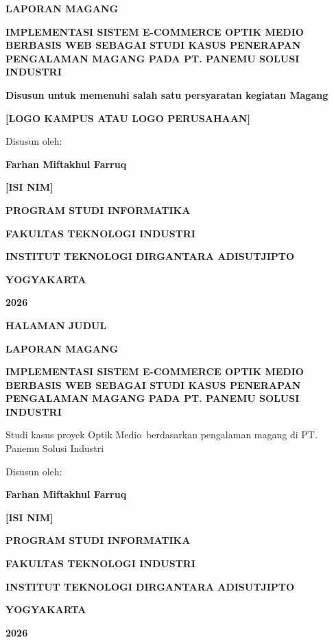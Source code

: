 \documentclass[12pt,a4paper,oneside]{report}
\newcommand{\placeholder}[1]{\textbf{[#1]}}
\newcommand{\namamahasiswa}{Farhan Miftakhul Farruq}
\newcommand{\nimmahasiswa}{\placeholder{ISI NIM}}
\newcommand{\programstudi}{Informatika}
\newcommand{\fakultas}{Fakultas Teknologi Industri}
\newcommand{\kampus}{Institut Teknologi Dirgantara Adisutjipto}
\newcommand{\tahunlaporan}{2026}
\newcommand{\tempatmagang}{PT. Panemu Solusi Industri}
\newcommand{\proyekstudi}{Optik Medio}
\newcommand{\judul}{Implementasi Sistem E-Commerce Optik Medio Berbasis Web sebagai Studi Kasus Penerapan Pengalaman Magang pada PT. Panemu Solusi Industri}
\begin{document}

\begin{titlepage}
  \centering
  \vspace*{1cm}
  {\bfseries LAPORAN MAGANG\par}
  \vspace{1.5cm}
  {\bfseries\MakeUppercase{\judul}\par}
  \vspace{1cm}
  {\bfseries Disusun untuk memenuhi salah satu persyaratan kegiatan Magang\par}
  \vspace{2cm}
  \placeholder{LOGO KAMPUS ATAU LOGO PERUSAHAAN}
  \vspace{2cm}

  Disusun oleh:\par
  \vspace{0.5cm}
  {\bfseries \namamahasiswa\par}
  {\bfseries \nimmahasiswa\par}

  \vfill
  {\bfseries PROGRAM STUDI \MakeUppercase{\programstudi}\par}
  {\bfseries \MakeUppercase{\fakultas}\par}
  {\bfseries \MakeUppercase{\kampus}\par}
  {\bfseries YOGYAKARTA\par}
  {\bfseries \tahunlaporan\par}
\end{titlepage}

\begin{titlepage}
  \centering
  \vspace*{1cm}
  {\bfseries HALAMAN JUDUL\par}
  \vspace{1.5cm}
  {\bfseries LAPORAN MAGANG\par}
  \vspace{1cm}
  {\bfseries\MakeUppercase{\judul}\par}
  \vspace{1cm}
  Studi kasus proyek \proyekstudi\ berdasarkan pengalaman magang di \tempatmagang\par
  \vspace{1.5cm}
  Disusun oleh:\par
  \vspace{0.5cm}
  {\bfseries \namamahasiswa\par}
  {\bfseries \nimmahasiswa\par}
  \vfill
  {\bfseries PROGRAM STUDI \MakeUppercase{\programstudi}\par}
  {\bfseries \MakeUppercase{\fakultas}\par}
  {\bfseries \MakeUppercase{\kampus}\par}
  {\bfseries YOGYAKARTA\par}
  {\bfseries \tahunlaporan\par}
\end{titlepage}
\end{document}
